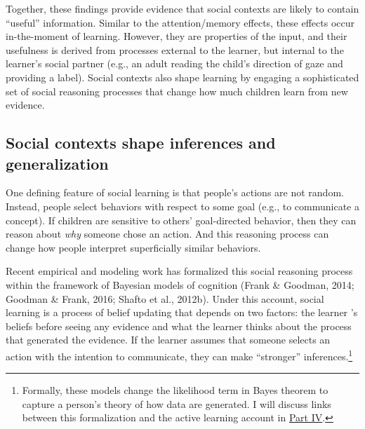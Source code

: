 \documentclass[english,floatsintext,man]{apa6}
\theoremstyle{definition}
\theoremstyle{definition}
\theoremstyle{definition}
\theoremstyle{remark}
\begin{document}
Together, these findings provide evidence that social contexts are
likely to contain \enquote{useful} information. Similar to the
attention/memory effects, these effects occur in-the-moment of learning.
However, they are properties of the input, and their usefulness is
derived from processes external to the learner, but internal to the
learner's social partner (e.g., an adult reading the child's direction
of gaze and providing a label). Social contexts also shape learning by
engaging a sophisticated set of social reasoning processes that change
how much children learn from new evidence.

\subsection{Social contexts shape inferences and
generalization}\label{social-contexts-shape-inferences-and-generalization}

One defining feature of social learning is that people's actions are not
random. Instead, people select behaviors with respect to some goal
(e.g., to communicate a concept). If children are sensitive to others'
goal-directed behavior, then they can reason about \emph{why} someone
chose an action. And this reasoning process can change how people
interpret superficially similar behaviors.

Recent empirical and modeling work has formalized this social reasoning
process within the framework of Bayesian models of cognition (Frank \&
Goodman, 2014; Goodman \& Frank, 2016; Shafto et al., 2012b). Under this
account, social learning is a process of belief updating that depends on
two factors: the learner 's beliefs before seeing any evidence and what
the learner thinks about the process that generated the evidence. If the
learner assumes that someone selects an action with the intention to
communicate, they can make \enquote{stronger} inferences.\footnote{Formally,
  these models change the likelihood term in Bayes theorem to capture a
  person's theory of how data are generated. I will discuss links
  between this formalization and the active learning account in
  \protect\hyperlink{p4}{Part IV}.}
\end{document}
